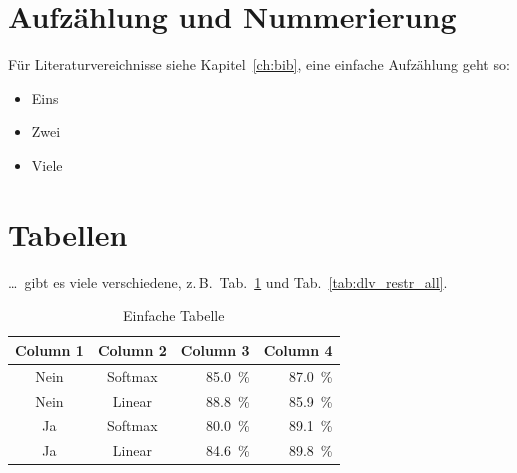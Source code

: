 \documentclass[12pt,DIV=15,BCOR=15mm,twoside,headsepline,abstract=true,listof=totoc,bibliography=totoc]{scrreprt}
\theoremstyle{remark}	%
\begin{document}
\section{Aufzählung und Nummerierung}
Für Literaturvereichnisse siehe Kapitel~\ref{ch:bib}, eine einfache Aufzählung geht so:
\begin{itemize}
 \item Eins
 \item Zwei
 \item Viele
\end{itemize}


\section{Tabellen}
\begin{table}[ht]
 \dots\ gibt es viele verschiedene, z.\,B.\ Tab.~\ref{tab:reservoir_segmentlabelling} und Tab.~\ref{tab:dlv_restr_all}. 
\caption{Einfache Tabelle}
\label{tab:reservoir_segmentlabelling}
\centering
  \begin{tabular}{ccrr}
        \toprule
             Column 1 & Column 2 & Column 3 & Column 4 \\
            \midrule
            Nein & Softmax & \SI{85,0}{\%} & \cellcolor{hellgrau} \SI{87,0}{\%} \\
            Nein & Linear & \cellcolor{hellgrau} \SI{88,8}{\%} & \SI{85,9}{\%} \\
            Ja & Softmax & \SI{80,0}{\%} & \cellcolor{hellgrau} \SI{89,1}{\%} \\
            Ja & Linear& \SI{84,6}{\%} & \cellcolor{hellgrau} \SI{89,8}{\%} \\
            \bottomrule
  \end{tabular}
\end{table} 
\end{document}
